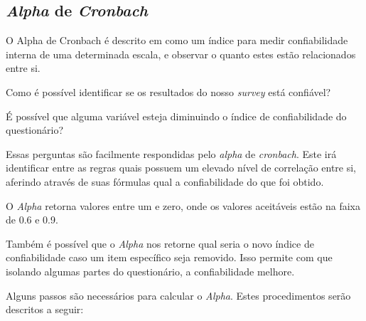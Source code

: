 \subsection{\textit{Alpha} de \textit{Cronbach}}
\label{sub:alpha_de_cronbach}
O Alpha de Cronbach é descrito em \cite{alphacron} como um índice para medir confiabilidade interna
de uma determinada escala, e observar o quanto estes estão relacionados entre si.

Como é possível identificar se os resultados do nosso \textit{survey} está confiável?

É possível que alguma variável esteja diminuindo o índice de confiabilidade do questionário?

Essas perguntas são facilmente respondidas pelo \textit{alpha} de \textit{cronbach}. Este irá identificar entre as regras quais possuem
um elevado nível de correlação entre si, aferindo através de suas fórmulas qual a confiabilidade do que foi obtido.

O \textit{Alpha} retorna valores entre um e zero, onde os valores aceitáveis estão na faixa de 0.6 e 0.9.

Também é possível que o \textit{Alpha} nos retorne qual seria o novo índice de confiabilidade caso um item específico seja removido.
Isso permite com que isolando algumas partes do questionário, a confiabilidade melhore.

Alguns passos são necessários para calcular o \textit{Alpha}. Estes procedimentos serão descritos a seguir:

